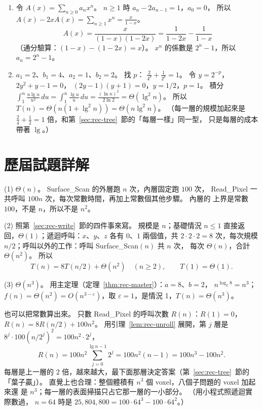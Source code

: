 \begin{enumerate}
\item 令 $A(x) = \sum_{n \ge 0} a_n x^n$。 $n \ge 1$ 時 $a_n - 2a_{n-1} = 1$，$a_0 = 0$，
所以 $A(x) - 2xA(x) = \sum_{n \ge 1} x^n = \frac{x}{1 - x}$。
\[
A(x) = \frac{x}{(1 - x)(1 - 2x)} = \frac{1}{1 - 2x} - \frac{1}{1 - x}
\]
（通分驗算：$(1 - x) - (1 - 2x) = x$）。 $x^n$ 的係數是 $2^n - 1$，所以
$a_n = 2^n - 1$。

\item $a_1 = 2$、$b_1 = 4$、$a_2 = 1$、$b_2 = 2$。 找 $p$：
$\frac{2}{4^p} + \frac{1}{2^p} = 1$。 令 $y = 2^{-p}$，$2y^2 + y - 1 = 0$，
$(2y - 1)(y + 1) = 0$，$y = 1/2$，$p = 1$。 積分
$\int_1^n \frac{u \lg u}{u^2}\, du = \int_1^n \frac{\lg u}{u}\, du =
\frac{(\ln n)^2}{2 \ln 2} = \Theta(\lg^2 n)$。 所以
$T(n) = \Theta(n (1 + \lg^2 n)) = \Theta(n \lg^2 n)$。 （每一層的規模加起來是
$\frac{2}{4} + \frac{1}{2} = 1$ 倍，和第~\ref{sec:rec-tree}~節的「每層一樣」同一型，
只是每層的成本帶著 $\lg$。）
\end{enumerate}

\section*{歷屆試題詳解}

(1) $\Theta(n)$。 \textsf{Surface\_Scan} 的外層跑 $n$ 次，內層固定跑 $100$ 次，
\textsf{Read\_Pixel} 一共呼叫 $100n$ 次，每次常數時間，再加上常數個其他步驟。 內層的
上界是常數 $100$，不是 $n$，所以不是 $n^2$。

(2) 照第~\ref{sec:rec-write}~節的四件事來寫。 規模是 $n$；基礎情況 $n \le 1$ 直接返
回，$\Theta(1)$；遞迴呼叫：$x$、$y$、$z$ 各有 $0$、$1$ 兩個值，共 $2 \cdot 2 \cdot 2
= 8$ 次，每次規模 $n/2$；呼叫以外的工作：呼叫 \textsf{Surface\_Scan}$(n)$ 共 $n$ 次，
每次 $\Theta(n)$，合計 $\Theta(n^2)$。 所以
\[
T(n) = 8T(n/2) + \Theta(n^2) \quad (n \ge 2), \qquad T(1) = \Theta(1).
\]

(3) $\Theta(n^3)$。 用主定理（定理~\ref{thm:rec-master}）：$a = 8$、$b = 2$，
$n^{\log_2 8} = n^3$；$f(n) = \Theta(n^2) = O(n^{3 - \varepsilon})$，取
$\varepsilon = 1$，是情況 1，$T(n) = \Theta(n^3)$。

也可以把常數算出來。 只數 \textsf{Read\_Pixel} 的呼叫次數 $R(n)$：$R(1) = 0$，
$R(n) = 8R(n/2) + 100n^2$。 用引理~\ref{lem:rec-unroll} 展開，第 $j$ 層是
$8^j \cdot 100 (n/2^j)^2 = 100 n^2 \cdot 2^j$，
\[
R(n) = 100 n^2 \sum_{j=0}^{\lg n - 1} 2^j = 100 n^2 (n - 1) = 100 n^3 - 100 n^2 .
\]
每層是上一層的 $2$ 倍，越來越大，最下面那層決定答案（第~\ref{sec:rec-tree}~節的
「葉子贏」）。 直覺上也合理：整個體積有 $n^3$ 個 voxel，八個子問題的 voxel 加起來還
是 $n^3$；每一層的表面掃描只占它那一層的一小部分。 （用小程式照遞迴實際數過，
$n = 64$ 時是 $25{,}804{,}800 = 100 \cdot 64^3 - 100 \cdot 64^2$。）

